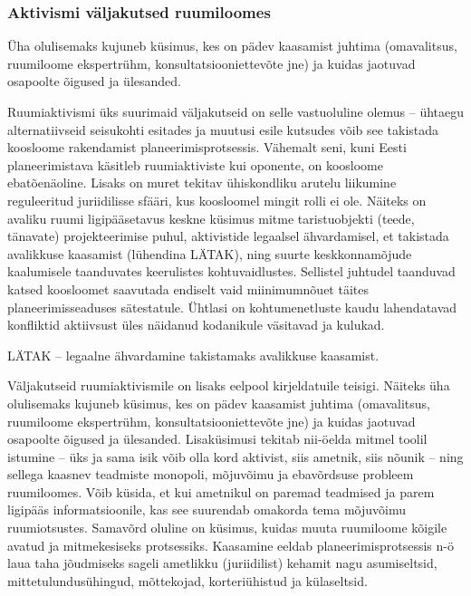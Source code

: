 \documentclass[estonian,]{article}
\begin{document}
\hypertarget{aktivismi-vuxe4ljakutsed-ruumiloomes}{%
\subsubsection*{Aktivismi väljakutsed ruumiloomes}\label{aktivismi-vuxe4ljakutsed-ruumiloomes}}

\begin{blockquote-right}
Üha olulisemaks kujuneb küsimus, kes on pädev kaasamist juhtima
(omavalitsus, ruumiloome ekspertrühm, konsultatsiooniettevõte jne) ja
kuidas jaotuvad osapoolte õigused ja ülesanded.
\end{blockquote-right}

Ruumiaktivismi üks suurimaid väljakutseid on selle vastuoluline olemus -- ühtaegu alternatiivseid seisukohti esitades ja muutusi esile kutsudes võib see takistada koosloome rakendamist planeerimisprotsessis. Vähemalt seni, kuni Eesti planeerimistava käsitleb ruumiaktiviste kui oponente, on koosloome ebatõenäoline. Lisaks on muret tekitav ühiskondliku arutelu liikumine reguleeritud juriidilisse sfääri, kus koosloomel mingit rolli ei ole. Näiteks on avaliku ruumi ligipääsetavus keskne küsimus mitme taristuobjekti (teede, tänavate) projekteerimise puhul, aktivistide legaalsel ähvardamisel, et takistada avalikkuse kaasamist (lühendina LÄTAK), ning suurte keskkonnamõjude kaalumisele taanduvates keerulistes kohtuvaidlustes. Sellistel juhtudel taanduvad katsed koosloomet saavutada endiselt vaid miinimumnõuet täites planeerimisseaduses sätestatule. Ühtlasi on kohtumenetluste kaudu lahendatavad konfliktid aktiivsust üles näidanud kodanikule väsitavad ja kulukad.

\begin{blockquote-left}
LÄTAK -- legaalne ähvardamine takistamaks avalikkuse kaasamist.
\end{blockquote-left}

Väljakutseid ruumiaktivismile on lisaks eelpool kirjeldatuile teisigi. Näiteks üha olulisemaks kujuneb küsimus, kes on pädev kaasamist juhtima (omavalitsus, ruumiloome ekspertrühm, konsultatsiooniettevõte jne) ja kuidas jaotuvad osapoolte õigused ja ülesanded. Lisaküsimusi tekitab nii-öelda mitmel toolil istumine -- üks ja sama isik võib olla kord aktivist, siis ametnik, siis nõunik -- ning sellega kaasnev teadmiste monopoli, mõjuvõimu ja ebavõrdsuse probleem ruumiloomes. Võib küsida, et kui ametnikul on paremad teadmised ja parem ligipääs informatsioonile, kas see suurendab omakorda tema mõjuvõimu ruumiotsustes. Samavõrd oluline on küsimus, kuidas muuta ruumiloome kõigile avatud ja mitmekesiseks protsessiks. Kaasamine eeldab planeerimisprotsessis n-ö laua taha jõudmiseks sageli ametlikku (juriidilist) kehamit nagu asumiseltsid, mittetulundusühingud, mõttekojad, korteriühistud ja külaseltsid.
\end{document}
